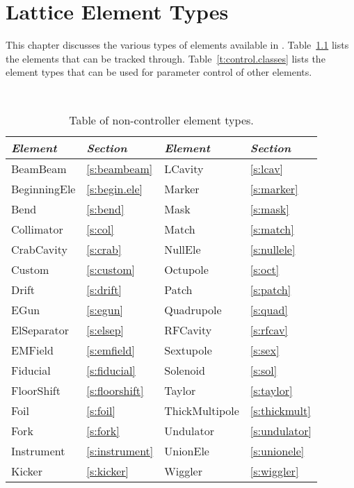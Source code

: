 \chapter{Lattice Element Types}
\label{c:ele.types}


This chapter discusses the various types of elements
available in \accellat.
Table~\ref{t:particle.classes} lists the elements that can be tracked through.
Table~\ref{t:control.classes} lists the  element types that can be used for parameter
control of other elements. 

\begin{table}[htb]
\centering
{\tt
\begin{tabular}{llll} \toprule
  {\it Element}    & {\it Section}         & {\it Element}      & {\it Section}       \\ \midrule
  BeamBeam         & \ref{s:beambeam}      &  LCavity           & \ref{s:lcav}        \\
  BeginningEle     & \ref{s:begin.ele}     &  Marker            & \ref{s:marker}      \\
  Bend             & \ref{s:bend}          &  Mask              & \ref{s:mask}        \\
  Collimator       & \ref{s:col}           &  Match             & \ref{s:match}       \\ 
  CrabCavity       & \ref{s:crab}          &  NullEle           & \ref{s:nullele}     \\
  Custom           & \ref{s:custom}        &  Octupole          & \ref{s:oct}         \\
  Drift            & \ref{s:drift}         &  Patch             & \ref{s:patch}       \\  
  EGun             & \ref{s:egun}          &  Quadrupole        & \ref{s:quad}        \\ 
  ElSeparator      & \ref{s:elsep}         &  RFCavity          & \ref{s:rfcav}       \\ 
  EMField          & \ref{s:emfield}       &  Sextupole         & \ref{s:sex}         \\ 
  Fiducial         & \ref{s:fiducial}      &  Solenoid          & \ref{s:sol}         \\
  FloorShift       & \ref{s:floorshift}    &  Taylor            & \ref{s:taylor}      \\
  Foil             & \ref{s:foil}          &  ThickMultipole    & \ref{s:thickmult}   \\
  Fork             & \ref{s:fork}          &  Undulator         & \ref{s:undulator}   \\
  Instrument       & \ref{s:instrument}    &  UnionEle          & \ref{s:unionele}    \\
  Kicker           & \ref{s:kicker}        &  Wiggler           & \ref{s:wiggler}     \\
  \bottomrule
\end{tabular}
} 
\caption{Table of non-controller element types.}
\label{t:particle.classes}
\end{table}

